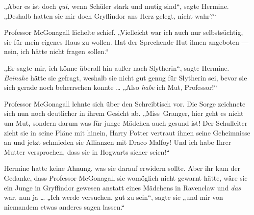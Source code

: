 „Aber es ist doch \emph{gut}, wenn Schüler stark und mutig sind“, sagte Hermine.
„Deshalb hatten sie mir doch Gryffindor ans Herz gelegt, nicht wahr?“

Professor McGonagall lächelte schief.
„Vielleicht war ich auch nur selbstsüchtig, sie für mein eigenes Haus zu wollen. Hat der Sprechende Hut ihnen angeboten — nein, ich hätte nicht fragen sollen.“

„Er sagte mir, ich könne überall hin außer nach Slytherin“, sagte Hermine. \emph{Beinahe} hätte sie gefragt, weshalb sie nicht gut genug für Slytherin sei, bevor sie sich gerade noch beherrschen konnte …
„Also \emph{habe} ich Mut, Professor!“

Professor McGonagall lehnte sich über den Schreibtisch vor. Die Sorge zeichnete sich nun noch deutlicher in ihrem Gesicht ab.
„Miss~Granger, hier geht es nicht um Mut, sondern darum was für junge Mädchen auch gesund ist! Der Schulleiter zieht sie in seine Pläne mit hinein, Harry Potter vertraut ihnen seine Geheimnisse an und jetzt schmieden sie Allianzen mit Draco Malfoy! Und ich habe Ihrer Mutter versprochen, dass sie in Hogwarts sicher seien!“

Hermine hatte keine Ahnung, was sie darauf erwidern sollte. Aber ihr kam der Gedanke, dass Professor McGonagall sie womöglich nicht gewarnt hätte, wäre sie ein Junge in Gryffindor gewesen anstatt eines Mädchens in Ravenclaw und \emph{das} war, nun ja …
„Ich werde versuchen, gut zu sein“, sagte sie „und mir von niemandem etwas anderes sagen lassen.“

